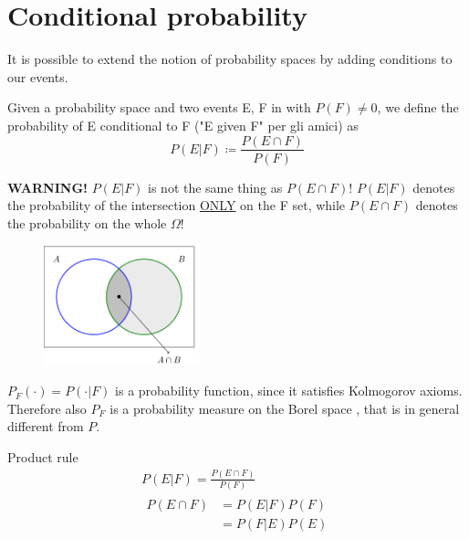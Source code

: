 \section{Conditional probability}
It is possible to extend the notion of probability spaces by adding conditions to our events.
\begin{definition}
    Given a probability space \probspace{} and two events E, F in \eff{} with $P(F) \neq 0$, we define the probability of E conditional to F ("E given F" per gli amici) as
    \begin{equation*}
        P(E|F) \coloneqq \frac{P(E \cap F)}{P(F)}
    \end{equation*}
\end{definition}
\textbf{WARNING!} $P(E|F)$ is not the same thing as $P(E \cap F)$! $P(E|F)$ denotes the probability of the intersection \underline{ONLY} on the F set, while $P(E \cap F)$ denotes the probability on the whole $\Omega$!
\begin{figure}[ht]
    \centering
    \includegraphics[width=0.4\textwidth]{images/conditional_b.png}
\end{figure}
\begin{remark}
    $P_F(\cdot) = P(\cdot{} | F) $ is a probability function, since it satisfies Kolmogorov axioms. Therefore also $P_F$ is a probability measure on the Borel space \borel, that is in general different from $P$.
\end{remark}
\begin{remark}
    Product rule
    \begin{equation*}
    \begin{gathered}
        P(E|F)=\frac{P(E \cap F)}{P(F)}\\
            \begin{aligned}
                P(E \cap F) & = P(E|F)P(F)\\
                & = P(F|E)P(E)
            \end{aligned}
    \end{gathered}
    \end{equation*}
\end{remark}
